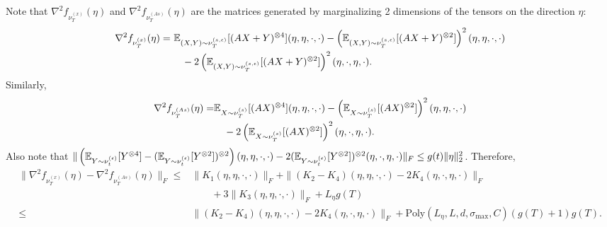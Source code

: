 Note that $\nabla^2f_{\nu_T^{(x)}}(\eta)$ and $\nabla^2f_{\nu_T^{(As)}}(\eta)$ are the matrices generated by marginalizing 2 dimensions of the tensors on the direction $\eta$:  
\begin{align*}
\nabla^2f_{\nu_T^{(x)}}(\eta) =\, &\, \mathbb{E}_{(X,Y)\sim \nu_T^{(s,\epsilon)}} [(AX+Y)^{\otimes 4}](\eta,\eta,\cdot,\cdot) - \left( \mathbb{E}_{(X,Y)\sim \nu_T^{(s,\epsilon)}} [(AX+Y)^{\otimes 2}]\right)^2 (\eta,\eta,\cdot,\cdot) \\
& \quad - 2\left( \mathbb{E}_{(X,Y)\sim \nu_T^{(s,\epsilon)}} [(AX+Y)^{\otimes 2}]\right)^2 (\eta,\cdot,\eta,\cdot).
\end{align*}
Similarly, 
\begin{align*}
\nabla^2f_{\nu_T^{(As)}}(\eta) = & \mathbb{E}_{X\sim \nu_T^{(s)}}[(AX)^{\otimes 4}](\eta,\eta,\cdot,\cdot) - \left(\mathbb{E}_{X\sim \nu_T^{(s)}}[(AX)^{\otimes 2}]\right)^2(\eta,\eta,\cdot,\cdot) \\
& \quad - 2 \left(\mathbb{E}_{X\sim \nu_T^{(s)}}[(AX)^{\otimes 2}]\right)^2(\eta,\cdot,\eta,\cdot). 
\end{align*}
Also note that  $\| \left(\mathbb{E}_{Y\sim \nu_t^{(\epsilon)}} [Y^{\otimes4}] - (\mathbb{E}_{Y\sim \nu_t^{(\epsilon)}} [Y^{\otimes2}])^{\otimes 2}\right)(\eta,\eta,\cdot,\cdot)  - 2 (\mathbb{E}_{Y\sim \nu_t^{(\epsilon)}} [Y^{\otimes2}])^{\otimes 2}(\eta,\cdot,\eta,\cdot)\|_F\le g(t)\|\eta\|_2^2$.
Therefore,
\begin{align*}
\|\nabla^2f_{\nu_T^{(x)}}(\eta) -  \nabla^2f_{\nu_T^{(As)}}(\eta) \|_F \le & \|K_1(\eta,\eta,\cdot, \cdot)\|_F + \|(K_2-K_4)(\eta,\eta,\cdot, \cdot) - 2K_4(\eta,\cdot,\eta,\cdot)\|_F \\
& \quad \quad + 3 \|K_3(\eta,\eta,\cdot, \cdot)\|_F + L_{\eta}g(T)\\
\le & \|(K_2-K_4)(\eta,\eta,\cdot, \cdot) - 2K_4(\eta,\cdot,\eta,\cdot)\|_F + \text{Poly}(L_{\eta}, L, d, \sigma_{\max}, C)(g(T)+1)g(T).
\end{align*}

